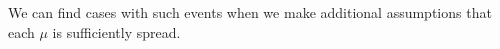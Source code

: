 \documentclass[a4paper]{article}
\newtheorem{theorem}{Theorem}
\newtheorem{proposition}[theorem]{Proposition}
\renewcommand\P{\mathbb{P}} %
\newcommand\EU{\mathrm{EU}}
\newcommand\EAd{\mathrm{EAd}}
\newcommand{\Decs}{\mathcal{D}}
\newcommand\s{\mathsf{s}}
\newcommand{\IB}{\mathbb{B}}
\newcommand{\IP}{\P}
\newcommand\SetDelimiter[1][]{
	\nonscript\,#1\vert \allowbreak \nonscript\,\mathopen{}}
\providecommand\given{\SetDelimiter}
\renewcommand{\emptyset}{\varnothing}
\newenvironment{CCM rewritten}
{\begingroup\color{blue}} %
{\endgroup}              %
\begin{document}
%

%		
%	
%


We can find cases with such events when we make additional assumptions that each $\mu$ is sufficiently spread. %
\end{document}
